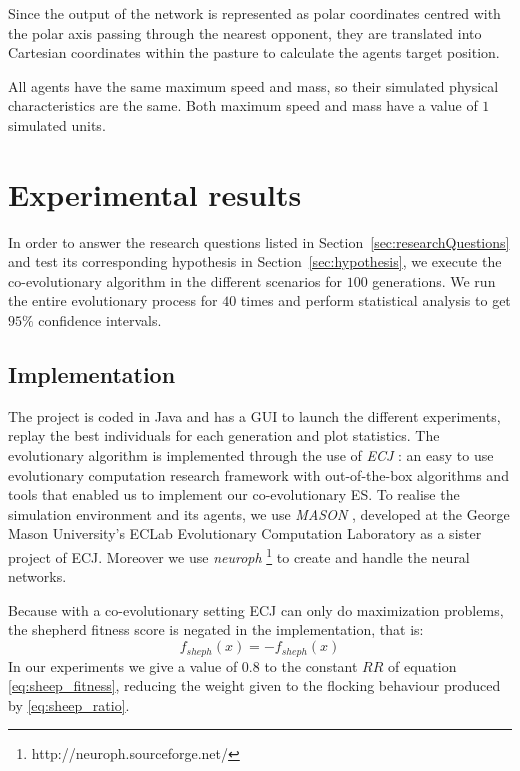 \documentclass[conference]{IEEEtran}
\begin{document}
Since the output of the network is represented as polar coordinates centred with the polar axis passing through the nearest opponent, they are translated into Cartesian coordinates within the pasture to calculate the agents target position.

All agents have the same maximum speed and mass, so their simulated physical characteristics are the same.
Both maximum speed and mass have a value of $1$ simulated units.



\section{Experimental results}
\label{sec:experiment}
In order to answer the research questions listed in {Section~\ref{sec:researchQuestions}} and test its corresponding hypothesis in {Section~\ref{sec:hypothesis}}, we execute the co-evolutionary algorithm in the different scenarios for $100$ generations. 
We run the entire evolutionary process for $40$ times and perform statistical analysis to get $95\%$ confidence intervals.

\subsection{Implementation}
\label{sec:implementation}
The project is coded in Java and has a GUI to launch the different experiments, replay the best individuals for each generation and plot statistics.
The evolutionary algorithm is implemented through the use of \textit{ECJ} \cite{luke2006ecj}: an easy to use evolutionary computation research framework with out-of-the-box algorithms and tools that enabled us to implement our co-evolutionary ES.
To realise the simulation environment and its agents, we use \textit{MASON} \cite{luke2005mason}, developed at the George Mason University's ECLab Evolutionary Computation Laboratory as a sister project of ECJ.
Moreover we use \textit{neuroph} \footnote{http://neuroph.sourceforge.net/} to create and handle the neural networks.

Because with a co-evolutionary setting ECJ can only do maximization problems, the shepherd fitness score is negated in the implementation, that is:
$$ f_{sheph}(x) = -f_{sheph}(x) $$
In our experiments we give a value of $0.8$ to the constant $RR$ of equation \eqref{eq:sheep_fitness}, reducing the weight given to the flocking behaviour produced by \eqref{eq:sheep_ratio}.
\end{document}
